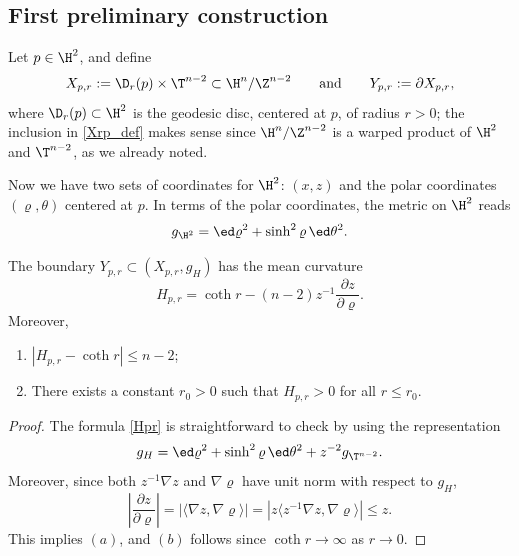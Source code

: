 \subsection{First preliminary construction}\label{1stprelimSec}
Let $p\in \H^2$, and define
\begin{equation}\label{Xrp_def}
	X_{p,r}:= \D_r(p)\times \T^{n-2}\subset \H^{n}/\Z^{n-2} \qquad
	\mbox{and} \qquad  Y_{p,r} :=\partial X_{p,r},
\end{equation}
where $\D_r(p)\subset \H^2$ is the geodesic disc, centered at $p$, of radius $r>0$;
the inclusion in \eqref{Xrp_def} makes sense since $\H^n/\Z^{n-2}$ is a warped product
of $\H^2$ and $\T^{n-2}$, as we already noted.

Now we have two sets of coordinates for $\H^2$: $(x,z)$ and the polar coordinates
$(\varrho,\theta)$ centered at $p$. In terms of the polar coordinates, the metric on $\H^2$ reads
\begin{equation*}%
	g_{\H^2} = \ed\varrho^2 + \sinh^2\varrho\,\ed\theta^2.
\end{equation*}



\begin{Lemma}\label{YprMean}
The boundary $Y_{p,r}\subset (X_{p,r}, g_H)$ has the mean curvature
\begin{equation}\label{Hpr}
	H_{p,r}=\coth r-(n-2)z^{-1}\frac{\partial z}{\partial \varrho}.
\end{equation}
Moreover,
\begin{enumerate}\itemsep=0pt
    \item[$(a)$] $|H_{p,r} - \coth r| \leq n-2$;
	\item[$(b)$] There exists a constant $r_0>0$ such that $H_{p,r}>0$ for all $r\leq r_0$.
\end{enumerate}

\end{Lemma}
\begin{proof}
The formula \eqref{Hpr} is straightforward to check by using the representation
\[
	g_H = \ed\varrho^2 + \sinh^2\varrho\,\ed\theta^2 + z^{-2}g_{\T^{n-2}}.
\]
Moreover, since both $z^{-1}\nabla z$ and $\nabla \varrho$ have unit norm with respect to $g_H$,
\begin{equation}\label{dzdrhoBd}
\left|\frac{\partial z}{\partial \varrho}\right|
= \left|\bigl\langle\nabla z, \nabla \varrho \bigr\rangle\right| =\left|z\bigl\langle z^{-1}\nabla z, \nabla \varrho \bigr\rangle\right|\le z.
\end{equation}
This implies $(a)$, and $(b)$ follows since $\coth r\rightarrow\infty$ as
$r\rightarrow 0$.
\end{proof}

